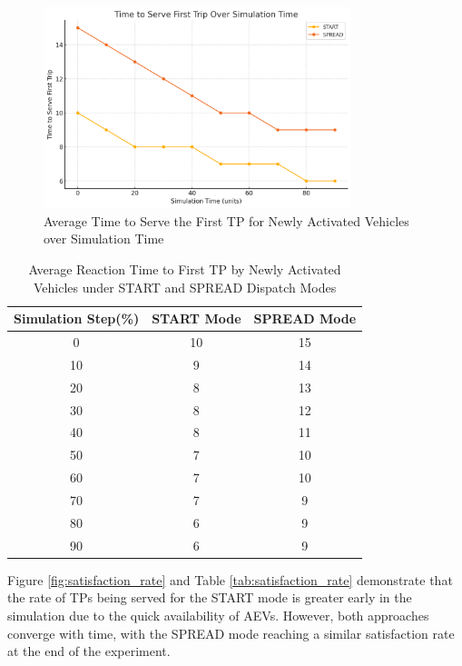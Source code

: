 \begin{figure}[h!]
    \centering
    \includegraphics[width=0.8\textwidth]{Crest/Images/first_trip_time.png}
    \caption{Average Time to Serve the First TP for Newly Activated Vehicles over Simulation Time}
    \label{fig:first_trip_time}
\end{figure}

\begin{table}[h!]
\centering
\begin{tabular}{|c|c|c|}
\hline
\textbf{Simulation Step(\%)} & \textbf{START Mode} & \textbf{SPREAD Mode} \\ \hline
0  & 10 & 15 \\ 
10 & 9  & 14 \\ 
20 & 8  & 13 \\ 
30 & 8  & 12 \\ 
40 & 8  & 11 \\ 
50 & 7  & 10 \\ 
60 & 7  & 10 \\ 
70 & 7  & 9  \\ 
80 & 6  & 9  \\ 
90 & 6  & 9  \\ \hline
\end{tabular}
\caption{Average Reaction Time to First TP by Newly Activated Vehicles under START and SPREAD Dispatch Modes}
\label{tab:first_trip_time}
\end{table}

Figure \ref{fig:satisfaction_rate} and Table \ref{tab:satisfaction_rate} demonstrate that the rate of TPs being served for the START mode is greater early in the simulation due to the quick availability of AEVs. However, both approaches converge with time, with the SPREAD mode reaching a similar satisfaction rate at the end of the experiment.


